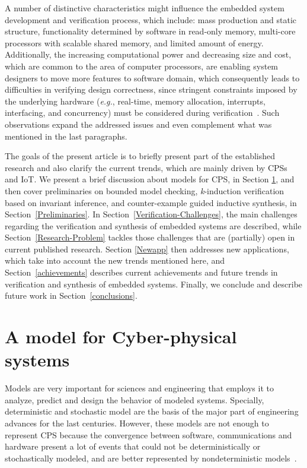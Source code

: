 \documentclass{acm_sen_article}
\begin{document}
A number of distinctive characteristics might influence the embedded system development and verification process, which include: mass production and static structure, functionality determined by software in read-only memory, multi-core processors with scalable shared memory, and limited amount of energy. Additionally, the increasing computational power and decreasing size and cost, which are common to the area of computer processors, are enabling system designers to move more features to software domain, which consequently leads to difficulties in verifying design correctness, since stringent constraints imposed by the underlying hardware ({\it e.g.}, real-time, memory allocation, interrupts, interfacing, and concurrency) must be considered during verification~\cite{Kroening15}. Such observations expand the addressed issues and even complement what was mentioned in the last paragraphs.

The goals of the present article is to briefly present part of the established research and also clarify the current trends, which are mainly driven by CPSs and IoT. We present a brief discussion about models for CPS, in Section \ref{sec:model}, and then cover preliminaries on bounded model checking, \textit{k}-induction verification based on invariant inference, and counter-example guided inductive synthesis, in Section~\ref{Preliminaries}. In Section~\ref{Verification-Challenges}, the main challenges regarding the verification and synthesis of embedded systems are described, while Section~\ref{Research-Problem} tackles those challenges that are (partially) open in current published research. Section \ref{Newapp} then addresses new applications, which take into account the new trends mentioned here, and Section~\ref{achievements} describes current achievements and future trends in verification and synthesis of embedded systems. Finally, we conclude and describe future work in Section~\ref{conclusions}.

\section{A model for Cyber-physical systems}
\label{sec:model}

Models are very important for sciences and engineering that employs it to analyze, predict and design the behavior of modeled systems. Specially, deterministic and stochastic model are the basis of the major part of engineering advances for the last centuries. However, these models are not enough to represent CPS because the convergence between software, communications and hardware present a lot of events that could not be deterministically or stochastically modeled, and are better represented by nondeterministic models~\cite{leeCPS15}.
\end{document}
